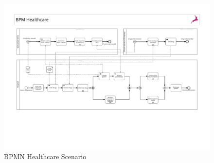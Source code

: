 
\begin{figure}[t]
\centering
\includegraphics[width=0.9\linewidth]{content/figures/healthcarescenario.pdf}
\caption{BPMN Healthcare Scenario}
\label{fig:BPMN_Healthcare}
\end{figure}

